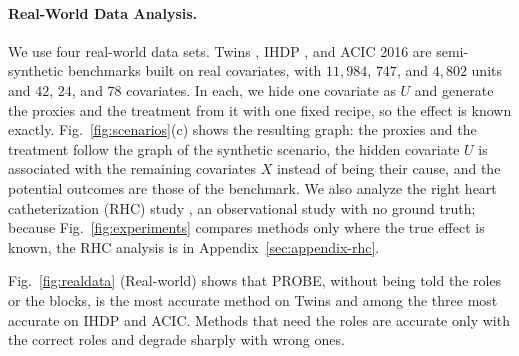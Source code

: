 \paragraph{Real-World Data Analysis.}\label{sec:real-world-analysis} We use four real-world data sets. Twins \citep{louizos2017causal}, IHDP \citep{hill2011bayesian}, and ACIC 2016 \citep{dorie2019automated} are semi-synthetic benchmarks built on real covariates, with $11{,}984$, $747$, and $4{,}802$ units and $42$, $24$, and $78$ covariates. In each, we hide one covariate as $U$ and generate the proxies and the treatment from it with one fixed recipe, so the effect is known exactly. Fig.~\ref{fig:scenarios}(c) shows the resulting graph: the proxies and the treatment follow the graph of the synthetic scenario, the hidden covariate $U$ is associated with the remaining covariates $X$ instead of being their cause, and the potential outcomes are those of the benchmark. We also analyze the right heart catheterization (RHC) study \citep{connors1996effectiveness}, an observational study with no ground truth; because Fig.~\ref{fig:experiments} compares methods only where the true effect is known, the RHC analysis is in Appendix~\ref{sec:appendix-rhc}.

Fig.~\ref{fig:realdata} (Real-world) shows that PROBE, without being told the roles or the blocks, is the most accurate method on Twins and among the three most accurate on IHDP and ACIC. Methods that need the roles are accurate only with the correct roles and degrade sharply with wrong ones.

